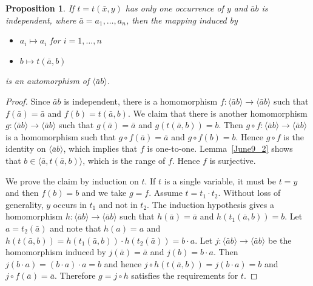 \documentclass[10pt,a4paper]{article}
\theoremstyle{note}
\newtheorem{prop}[thm]{Proposition}
\begin{document}
	\begin{prop}\label{June9_3} If $t= t(\bar{x},y)$ has only one occurrence of $y$ and $\bar{a}b$ is independent, where $\bar{a}=a_1,\ldots,a_n$, then the mapping induced by
		\begin{itemize}
			\item $a_i\mapsto a_i$  for $i=1,\ldots,n$
			\item $b\mapsto t(\bar{a},b)$
		\end{itemize}
		is an automorphism of  $\langle \bar{a}b\rangle$.
	\end{prop}
	\begin{proof} Since $\bar{a}b$ is independent, there is a homomorphism $f:\langle\bar{a}b\rangle\rightarrow \langle\bar{a}b\rangle$  such that  $f(\bar{a}) = \bar{a}$    and  $f(b)= t(\bar{a},b)$.  We claim that there is another homomorphism $g:\langle\bar{a}b\rangle\rightarrow \langle\bar{a}b\rangle$  such that  $g(\bar{a}) = \bar{a}$   and  $g(t(\bar{a},b))= b$. Then  $g\circ f:\langle\bar{a}b\rangle \rightarrow \langle\bar{a}b\rangle$ is a homomorphism  such that  $g\circ f(\bar{a})= \bar{a}$    and $g\circ f(b)=b$. Hence $g\circ f$ is the identity on $\langle\bar{a}b\rangle$, which implies that $f$ is one-to-one. Lemma~\ref{June9_2}  shows that $b\in\langle \bar{a}, t(\bar{a},b)\rangle$, which is the range of $f$. Hence $f$ is surjective.
		
		We prove the claim by induction on $t$.  If  $t$ is a single variable, it must be  $t= y$ and then $f(b)=b$  and we take $g=f$.  Assume $t= t_1\cdot t_2$. Without loss of generality, $y$ occurs in $t_1$ and not in $t_2$.  The induction hypothesis gives a homomorphism $h:\langle\bar{a}b\rangle\rightarrow\langle \bar{a}b\rangle$ such that  $h(\bar{a})= \bar{a}$ and $h(t_1(\bar{a},b))= b$. Let $a= t_2(\bar{a})$ and note that  $h(a)=a$  and $h(t(\bar{a},b))= h(t_1(\bar{a},b))\cdot h(t_2(\bar{a}))= b\cdot a$. Let $j:\langle\bar{a}b\rangle\rightarrow\langle \bar{a}b\rangle$ be the homomorphism induced by  $j(\bar{a})=  \bar{a}$   and $j(b) =b\cdot a$. Then  $j(b\cdot a)= (b\cdot a)\cdot a =b$ and hence  $j\circ h(t(\bar{a},b))= j(b\cdot a) = b$   and  $j\circ f(\bar{a})= \bar{a}$. Therefore $g= j\circ h$ satisfies the requirements for $t$.
	\end{proof}
\end{document}
